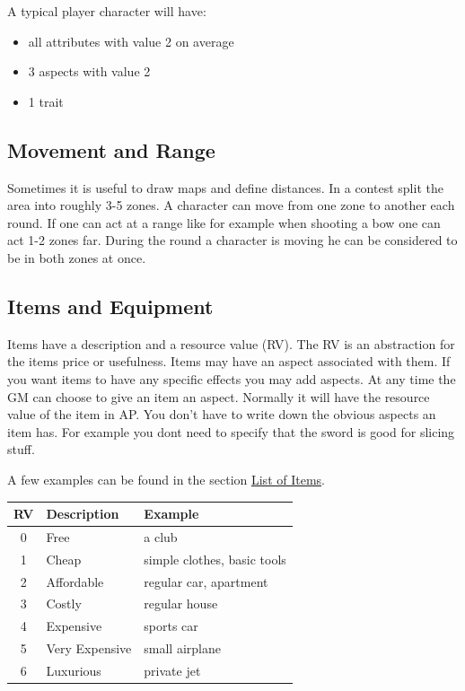 \documentclass[11pt]{article}
\begin{document}
{A typical player character will have:
\begin{itemize}
\item all attributes with value 2 on average
\item 3 aspects with value 2
\item 1 trait
\end{itemize}

\subsection{Movement and Range}
\label{sec:org1316a9e}
Sometimes it is useful to draw maps and define distances. In a contest split the area into roughly 3-5 zones. A character can move from one zone to another each round. If one can act at a range like for example when shooting a bow one can act 1-2 zones far. During the round a character is moving he can be considered to be in both zones at once.

\subsection{Items and Equipment}
\label{sec:org7abc812}
Items have a description and a resource value (RV). The RV is an abstraction for the items price or usefulness. 
Items may have an aspect associated with them. If you want items to have any specific effects you may add aspects. At any time the GM can choose to give an item an aspect. Normally it will have the resource value of the item in AP. You don't have to write down the obvious aspects an item has. For example you dont need to specify that the sword is good for slicing stuff.

A few examples can be found in the section \hyperref[sec:org1a307e8]{List of Items}.

\begin{center}
\begin{tabular}{c|l|l}
\textbf{RV} & \textbf{Description} & \textbf{Example}\\[0pt]
\hline
0 & Free & a club\\[0pt]
1 & Cheap & simple clothes, basic tools\\[0pt]
2 & Affordable & regular car, apartment\\[0pt]
3 & Costly & regular house\\[0pt]
4 & Expensive & sports car\\[0pt]
5 & Very Expensive & small airplane\\[0pt]
6 & Luxurious & private jet\\[0pt]
\end{tabular}
\end{center}

}
\end{document}
